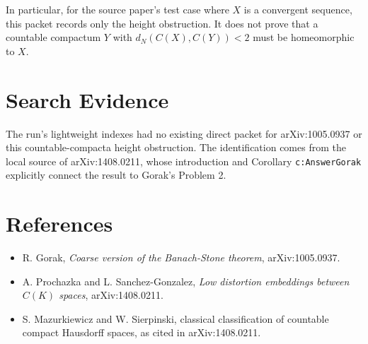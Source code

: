 \documentclass[11pt]{article}
\begin{document}
In particular, for the source paper's test case where \(X\) is a convergent
sequence, this packet records only the height obstruction.  It does not prove
that a countable compactum \(Y\) with \(d_N(C(X),C(Y))<2\) must be homeomorphic
to \(X\).

\section{Search Evidence}

The run's lightweight indexes had no existing direct packet for arXiv:1005.0937
or this countable-compacta height obstruction.  The identification comes from
the local source of arXiv:1408.0211, whose introduction and Corollary
\texttt{c:AnswerGorak} explicitly connect the result to Gorak's Problem 2.

\section{References}

\begin{itemize}[leftmargin=*]
\item R. Gorak, \emph{Coarse version of the Banach-Stone theorem},
arXiv:1005.0937.
\item A. Prochazka and L. Sanchez-Gonzalez, \emph{Low distortion embeddings
between \(C(K)\) spaces}, arXiv:1408.0211.
\item S. Mazurkiewicz and W. Sierpinski, classical classification of countable
compact Hausdorff spaces, as cited in arXiv:1408.0211.
\end{itemize}
\end{document}
